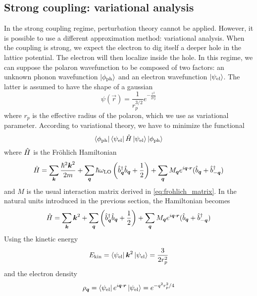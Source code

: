 \subsection{Strong coupling: variational analysis}
In the strong coupling regime, perturbation theory cannot be applied. However, it is possible to use a different approximation method: variational analysis. When the coupling is strong, we expect the electron to dig itself a deeper hole in the lattice potential. The electron will then localize inside the hole. In this regime, we can suppose the polaron wavefunction to be composed of two factors: an unknown phonon wavefunction $\ket{\phi_\text{ph}}$ and an electron wavefunction $\ket{\psi_\text{el}}$. The latter is assumed to have the shape of a gaussian
\begin{equation}
    \psi(\vec{r}) = \frac{1}{r_p^{3/2}}e^{-\frac{r^2}{2r_p^2}}
\end{equation}
where $r_p$ is the effective radius of the polaron, which we use as variational parameter. According to variational theory, we have to minimize the functional
\begin{equation}
    \bra{\phi_\text{ph}} \bra{\psi_\text{el}} \hat{H} \ket{\psi_\text{el}} \ket{\phi_\text{ph}}
\end{equation}
where $\hat{H}$ is the Fr\"{o}hlich Hamiltonian
\begin{equation}
    \hat{H} = \sum_{\mathbf{\boldsymbol{k}}} \frac{\hbar^2\mathbf{\boldsymbol{k}}^2}{2m}
    + \sum_{\mathbf{\boldsymbol{q}}} \hbar \omega_\text{LO} \left( \hat{b}^\dagger_{ \mathbf{\boldsymbol{q}}} \hat{b}_{ \mathbf{\boldsymbol{q}}} + \frac{1}{2} \right)
    + \sum_{\mathbf{\boldsymbol{q}}} M_{\mathbf{\boldsymbol{q}}} e^{i\mathbf{\boldsymbol{q}}\cdot\mathbf{\boldsymbol{r}}} (\hat{b}_{\mathbf{\boldsymbol{q}}} + \hat{b}^\dagger_{-\mathbf{\boldsymbol{q}}})
\end{equation}
and $M$ is the usual interaction matrix derived in \cref{eq:frohlich_matrix}. In the natural units introduced in the previous section, the Hamiltonian becomes
\begin{equation}
    \hat{H} = \sum_{\mathbf{\boldsymbol{k}}} \mathbf{\boldsymbol{k}}^2
    + \sum_{\mathbf{\boldsymbol{q}}} \left( \hat{b}^\dagger_{ \mathbf{\boldsymbol{q}}} \hat{b}_{ \mathbf{\boldsymbol{q}}} + \frac{1}{2} \right)
    + \sum_{\mathbf{\boldsymbol{q}}} M_{\mathbf{\boldsymbol{q}}} e^{i\mathbf{\boldsymbol{q}}\cdot\mathbf{\boldsymbol{r}}} (\hat{b}_{\mathbf{\boldsymbol{q}}} + \hat{b}^\dagger_{-\mathbf{\boldsymbol{q}}})
\end{equation}
Using the kinetic energy
\begin{equation}
    E_\text{kin} = \bra{\psi_\text{el}} \mathbf{\boldsymbol{k}}^2 \ket{\psi_\text{el}}  = \frac{3}{2r_p^2}
\end{equation}
and the electron density
\begin{equation} \label{eq:electron_density}
    \rho_{\mathbf{\boldsymbol{q}}} = \bra{\psi_\text{el}} e^{i\mathbf{\boldsymbol{q}}\cdot\mathbf{\boldsymbol{r}}} \ket{\psi_\text{el}} = e^{-q^2r_p^2/4}
\end{equation}
